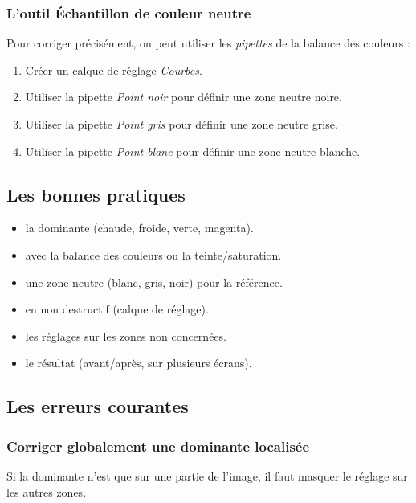 \subsubsection{L'outil Échantillon de couleur neutre}

Pour corriger précisément, on peut utiliser les \emph{pipettes} de la balance des couleurs :

\begin{enumerate}
    \item Créer un calque de réglage \emph{Courbes}.
    \item Utiliser la pipette \emph{Point noir} pour définir une zone neutre noire.
    \item Utiliser la pipette \emph{Point gris} pour définir une zone neutre grise.
    \item Utiliser la pipette \emph{Point blanc} pour définir une zone neutre blanche.
\end{enumerate}

\subsection{Les bonnes pratiques}

\begin{itemize}
    \item {} la dominante (chaude, froide, verte, magenta).
    \item {} avec la balance des couleurs ou la teinte/saturation.
    \item {} une zone neutre (blanc, gris, noir) pour la référence.
    \item {} en non destructif (calque de réglage).
    \item {} les réglages sur les zones non concernées.
    \item {} le résultat (avant/après, sur plusieurs écrans).
\end{itemize}

\subsection{Les erreurs courantes}

\subsubsection{Corriger globalement une dominante localisée}

Si la dominante n'est que sur une partie de l'image, il faut masquer le réglage sur les autres zones.

